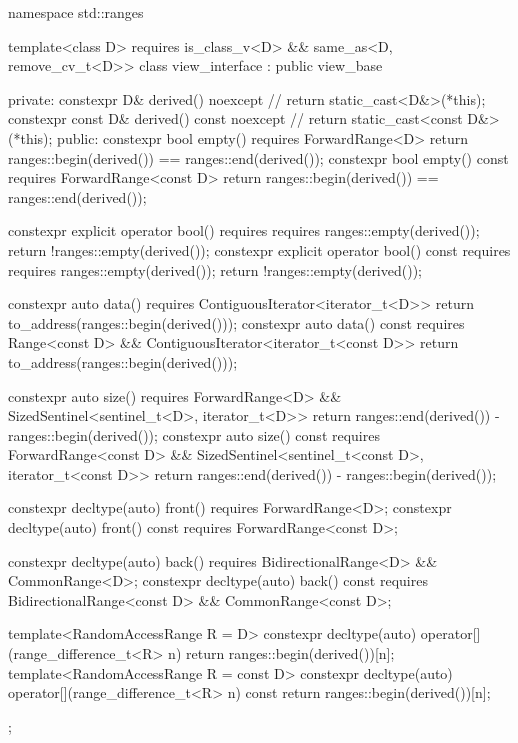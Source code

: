 %
\begin{codeblock}
namespace std::ranges {
  template<class D>
    requires is_class_v<D> && same_as<D, remove_cv_t<D>>
  class view_interface : public view_base {
  private:
    constexpr D& derived() noexcept {                   // \expos
      return static_cast<D&>(*this);
    }
    constexpr const D& derived() const noexcept {       // \expos
      return static_cast<const D&>(*this);
    }
  public:
    constexpr bool empty() requires ForwardRange<D> {
      return ranges::begin(derived()) == ranges::end(derived());
    }
    constexpr bool empty() const requires ForwardRange<const D> {
      return ranges::begin(derived()) == ranges::end(derived());
    }

    constexpr explicit operator bool()
      requires requires { ranges::empty(derived()); } {
        return !ranges::empty(derived());
      }
    constexpr explicit operator bool() const
      requires requires { ranges::empty(derived()); } {
        return !ranges::empty(derived());
      }

    constexpr auto data() requires ContiguousIterator<iterator_t<D>> {
      return to_address(ranges::begin(derived()));
    }
    constexpr auto data() const
      requires Range<const D> && ContiguousIterator<iterator_t<const D>> {
        return to_address(ranges::begin(derived()));
      }

    constexpr auto size() requires ForwardRange<D> &&
      SizedSentinel<sentinel_t<D>, iterator_t<D>> {
        return ranges::end(derived()) - ranges::begin(derived());
      }
    constexpr auto size() const requires ForwardRange<const D> &&
      SizedSentinel<sentinel_t<const D>, iterator_t<const D>> {
        return ranges::end(derived()) - ranges::begin(derived());
      }

    constexpr decltype(auto) front() requires ForwardRange<D>;
    constexpr decltype(auto) front() const requires ForwardRange<const D>;

    constexpr decltype(auto) back() requires BidirectionalRange<D> && CommonRange<D>;
    constexpr decltype(auto) back() const
      requires BidirectionalRange<const D> && CommonRange<const D>;

    template<RandomAccessRange R = D>
      constexpr decltype(auto) operator[](range_difference_t<R> n) {
        return ranges::begin(derived())[n];
      }
    template<RandomAccessRange R = const D>
      constexpr decltype(auto) operator[](range_difference_t<R> n) const {
        return ranges::begin(derived())[n];
      }
  };
}
\end{codeblock}

